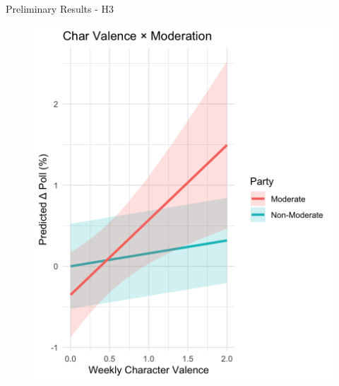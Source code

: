 \documentclass[9pt, aspectratio=169]{beamer}
\begin{document}
\begin{frame}{Preliminary Results - H3}
    \begin{multicols}{2}
        \begin{figure}
            \centering
            \includegraphics[width=0.8\linewidth]{images/poll_moderation.png}
            \label{fig:poll_moderation}
        \end{figure}
        

\end{multicols}
\end{frame}
\end{document}

